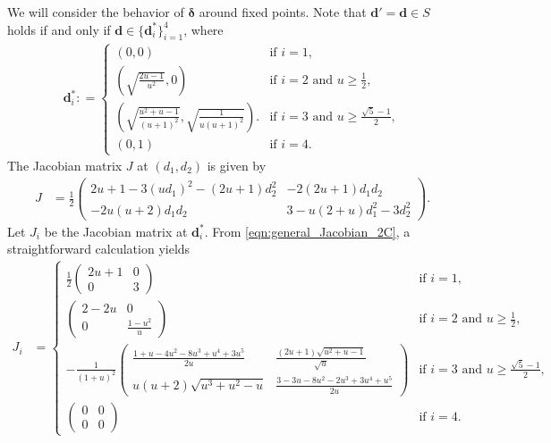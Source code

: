 \documentclass[letterpaper,11pt]{article}
\def\defeq{\mathrel{\mathop:}=}%
\begin{document}
We will consider the behavior of ${\boldsymbol \delta}$ around fixed points.
Note that $\mathbf{d}'=\mathbf{d}\in S$ holds if and only if $\mathbf{d}\in\{\mathbf{d}^*_i\}_{i=1}^4$,
where
\begin{align} \label{eqn:fixed_points_2C}
\mathbf{d}^*_i \defeq \begin{cases}
(0,0) & \text{if $i=1$},\\
\left(\sqrt{\frac{2u-1}{u^2}},0\right)& \text{if $i=2$ and $u\geq\frac{1}{2}$},\\
\left(\sqrt{\frac{u^2+u-1}{(u+1)^2}},\sqrt{\frac{1}{u(u+1)^2}}\right). & \text{if $i=3$ and $u\geq\frac{\sqrt{5}-1}{2}$},\\
(0,1) & \text{if $i=4$}.
\end{cases}
\end{align}
The Jacobian matrix $J$ at $(d_1,d_2)$ is given by
\begin{align} \label{eqn:general_Jacobian_2C}
J&=\frac{1}{2}\left( \begin{array}{cc}
2u+1-3(u d_1)^2-(2u+1) d_2^2 & -2(2u+1) d_1 d_2 \\
-2u(u+2) d_1 d_2 & 3-u(2+u) d_1^2-3d_2^2
\end{array} \right).
\end{align}
Let $J_i$ be the Jacobian matrix at $\mathbf{d}^*_i$.
From \cref{eqn:general_Jacobian_2C}, a straightforward calculation yields
\begin{align}  \label{eqn:Jacobian_2C}
J_i&=\begin{cases}
\frac{1}{2}\left( \begin{array}{cc}
2u+1 & 0 \\
0 & 3
\end{array} \right) & \text{if $i=1$}, \\
\left( \begin{array}{cc}
2-2u & 0 \\
0 & \frac{1-u^2}{u}
\end{array} \right) & \text{if $i=2$ and $u\geq \frac{1}{2}$}, \\
-\frac{1}{(1+u)^2}\left( \begin{array}{cc}
\frac{1+u-4u^2-8u^3+u^4+3u^5}{2u} & \frac{(2u+1)\sqrt{u^2+u-1}}{\sqrt{u}} \\
u(u+2)\sqrt{u^3+u^2-u} & \frac{3-3u-8u^2-2u^3+3u^4+u^5}{2u}
\end{array} \right) & \text{if $i=3$ and $u\geq \frac{\sqrt{5}-1}{2}$}, \\
\left( \begin{array}{cc}
0 & 0 \\
0 & 0
\end{array} \right) & \text{if $i=4$}.
\end{cases}
\end{align}
\end{document}
